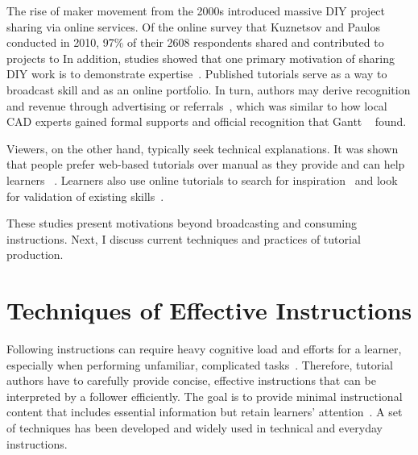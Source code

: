 The rise of maker movement from the 2000s introduced massive DIY project sharing via online services. Of the online survey that Kuznetsov and Paulos~\cite{Kuznetsov:2010:REA:1868914.1868950} conducted in 2010, 97\% of their 2608 respondents shared and contributed to projects to  In addition, studies showed that one primary motivation of sharing DIY work is to demonstrate expertise~\cite{Torrey:2007he,Kuznetsov:2010:REA:1868914.1868950}. Published tutorials serve as a way to broadcast skill and as an online portfolio.
%
In turn, authors may derive recognition and revenue through advertising or referrals~\cite{Lafreniere:2012tl}, which was similar to how local CAD experts gained formal supports and official recognition that Gantt \ea{}~\cite{Gantt:1992:GGP:142750.142767} found.

Viewers, on the other hand, typically seek technical explanations. It was shown that people prefer web-based tutorials over manual as they provide  and can help learners ~\cite{BenLafreniere:2013ux}.
%
Learners also use online tutorials to search for inspiration~\cite{Torrey:2009fc} and look for validation of existing skills~\cite{Lafreniere:2012tl}.

These studies present motivations beyond broadcasting and consuming instructions. Next, I discuss current techniques and practices of tutorial production.



\section{Techniques of Effective Instructions}
\label{background_techniques}

Following instructions can require heavy cognitive load and efforts for a learner, especially when performing unfamiliar, complicated tasks~\cite{sweller1998cognitive,sweller1988cognitive}. Therefore, tutorial authors have to carefully provide concise, effective instructions that can be interpreted by a follower efficiently. The goal is to provide minimal instructional content that includes essential information but retain learners' attention~\cite{Black:1986:KMI:29933.275623}.
%
A set of techniques has been developed and widely used in technical and everyday instructions.

